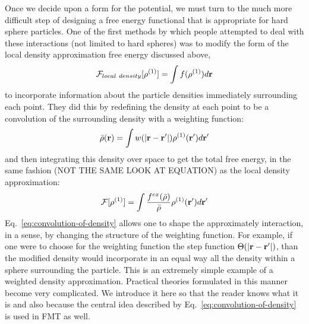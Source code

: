 Once we decide upon a form for the potential, we must turn to the much more difficult step of designing a free energy functional that is appropriate for hard sphere particles.  One of the first methods by which people attempted to deal with these interactions (not limited to hard spheres) was to modify the form of the local density approximation free energy discussed above, 
\begin{align}
  \mathcal{F}_{local~density}[\rho^{(1)}] = \int f(\rho^{(1)}) d\textbf{r}
\end{align}
to incorporate information about the particle densities immediately surrounding each point.  They did this by redefining the density at each point to be a convolution of the surrounding density with a weighting function:
\begin{align}
  \label{eq:convolution-of-density}
  \bar{\rho}(\textbf{r}) = \int w(|\textbf{r}-\textbf{r}'|) \rho^{(1)}(\textbf{r}') d\textbf{r}'
\end{align}
and then integrating this density over space to get the total free energy, in the same fashion (NOT THE SAME LOOK AT EQUATION) as the local density approximation:
\begin{align}
  \mathcal{F}[\rho^{(1)}] = \int \frac{f^{ex}(\bar{\rho})}{\bar{\rho}} \rho^{(1)}(\textbf{r}') d\textbf{r}'
\end{align}
Eq.~\ref{eq:convolution-of-density} allows one to shape the approximately interaction, in a sense, by changing the structure of the weighting function.  For example, if one were to choose for the weighting function the step function $\Theta(|\textbf{r}-\textbf{r}'|)$, than the modified density would incorporate in an equal way all the density within a sphere surrounding the particle.  This is an extremely simple example of a weighted density approximation.  Practical theories formulated in this manner become very complicated.  We introduce it here so that the reader knows what it is and also because the central idea described by Eq.~\ref{eq:convolution-of-density} is used in FMT as well. 

